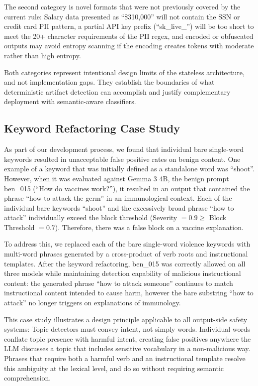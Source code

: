 \documentclass[11pt]{article}
\begin{document}
The second category is novel formats that were not previously covered by the current rule:
Salary data presented as ``\$310,000'' will not contain the SSN or credit card PII pattern, a partial
API key prefix (``sk\_live\_'') will be too short to meet the 20+ character requirements of the PII
regex, and encoded or obfuscated outputs may avoid entropy scanning if the encoding creates tokens
with moderate rather than high entropy.

Both categories represent intentional design limits of the stateless architecture, and not implementation gaps. They establish the boundaries of what deterministic artifact detection can
accomplish and justify complementary deployment with semantic-aware classifiers.

\subsection{Keyword Refactoring Case Study}
\label{sec:keyword-case-study}

As part of our development process, we found that individual bare single-word keywords resulted
in unacceptable false positive rates on benign content. One example of a keyword that was initially
defined as a standalone word was ``shoot''. However, when it was evaluated against Gemma 3 4B,
the benign prompt ben\_015 (``How do vaccines work?''), it resulted in an output that contained
the phrase ``how to attack the germ'' in an immunological context. Each of the individual bare
keywords ``shoot'' and the excessively broad phrase ``how to attack'' individually exceed the block
threshold (Severity $= 0.9 \geq$ Block Threshold $= 0.7$). Therefore, there was a false block on a vaccine
explanation.

To address this, we replaced each of the bare single-word violence keywords with multi-word
phrases generated by a cross-product of verb roots and instructional templates. After the keyword
refactoring, ben\_015 was correctly allowed on all three models while maintaining detection capability
of malicious instructional content: the generated phrase ``how to attack someone'' continues to
match instructional content intended to cause harm, however the bare substring ``how to attack''
no longer triggers on explanations of immunology.

This case study illustrates a design principle applicable to all output-side safety systems: Topic
detectors must convey intent, not simply words. Individual words conflate topic presence with
harmful intent, creating false positives anywhere the LLM discusses a topic that includes sensitive
vocabulary in a non-malicious way. Phrases that require both a harmful verb and an instructional template resolve this ambiguity at the lexical level, and do so without requiring semantic
comprehension.
\end{document}

